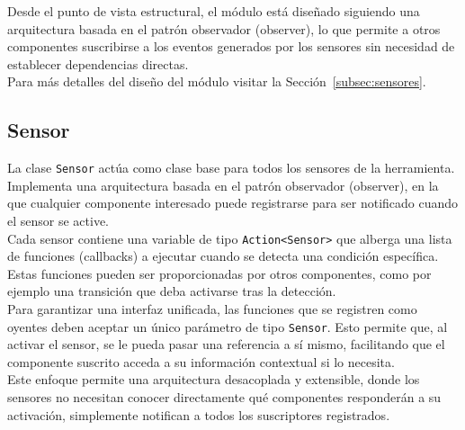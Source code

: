 Desde el punto de vista estructural, el módulo está diseñado siguiendo una arquitectura basada en el patrón observador (observer), lo que permite a otros componentes suscribirse a los eventos generados por los sensores sin necesidad de establecer dependencias directas.\\


Para más detalles del diseño del módulo visitar la Sección~\ref{subsec:sensores}.


\subsection{Sensor}
La clase \texttt{Sensor} actúa como clase base para todos los sensores de la herramienta. Implementa una arquitectura basada en el patrón observador (observer), en la que cualquier componente interesado puede registrarse para ser notificado cuando el sensor se active.\\

Cada sensor contiene una variable de tipo \texttt{Action<Sensor>} que alberga una lista de funciones (callbacks) a ejecutar cuando se detecta una condición específica. Estas funciones pueden ser proporcionadas por otros componentes, como por ejemplo una transición que deba activarse tras la detección.\\

Para garantizar una interfaz unificada, las funciones que se registren como oyentes deben aceptar un único parámetro de tipo \texttt{Sensor}. Esto permite que, al activar el sensor, se le pueda pasar una referencia a sí mismo, facilitando que el componente suscrito acceda a su información contextual si lo necesita.\\

Este enfoque permite una arquitectura desacoplada y extensible, donde los sensores no necesitan conocer directamente qué componentes responderán a su activación, simplemente notifican a todos los suscriptores registrados.\\

